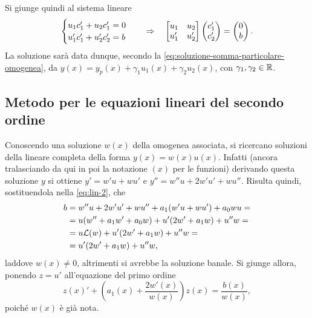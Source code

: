 Si giunge quindi al sistema lineare
\begin{equation}
\begin{cases}
u_1c'_1+u_2c'_1=0\\u'_1c'_1+u'_2c'_2=b
\end{cases}\quad\Rightarrow\quad
\begin{bmatrix}u_1&u_2\\u'_1&u'_2\end{bmatrix}\begin{pmatrix}c'_1\\c'_2\end{pmatrix}=
\begin{pmatrix}0\\b\end{pmatrix}.
\end{equation}
La soluzione sarà data dunque, secondo la \eqref{eq:soluzione-somma-particolare-omogenea}, da $y(x)=y_p(x)+\gamma_1u_1(x)+\gamma_2u_2(x)$, con $\gamma_1,\gamma_2\in\mathbb{R}$.

\subsection*{Metodo per le equazioni lineari del secondo ordine}
Conoscendo una soluzione $w(x)$ della omogenea associata, si ricercano soluzioni della lineare completa della forma $y(x)=w(x)u(x)$. Infatti (ancora tralasciando da qui in poi la notazione $(x)$ per le funzioni) derivando questa soluzione $y$ si ottiene $y'=w'u+wu'$ e $y''=w''u+2w'u'+wu''$. Risulta quindi, sostituendola nella \eqref{eq:lin-2}, che
\[\begin{split}
b	&=w''u+2w'u'+wu''+a_1(w'u+wu')+a_0wu=\\
	&=u(w''+a_1w'+a_0w)+u'(2w'+a_1w)+u''w=\\
	&=u\mathcal L(w)+u'(2w'+a_1w)+u''w=\\
	&=u'(2w'+a_1w)+u''w,
\end{split}\]
laddove $w(x)\neq 0$, altrimenti si avrebbe la soluzione banale. Si giunge allora, ponendo $z=u'$ all'equazione del primo ordine
\begin{equation}
z(x)'+\left(\!a_1(x)+\frac{2w'(x)}{w(x)}\!\right)z(x)=\frac{b(x)}{w(x)},
\end{equation}
poiché $w(x)$ è già nota.

